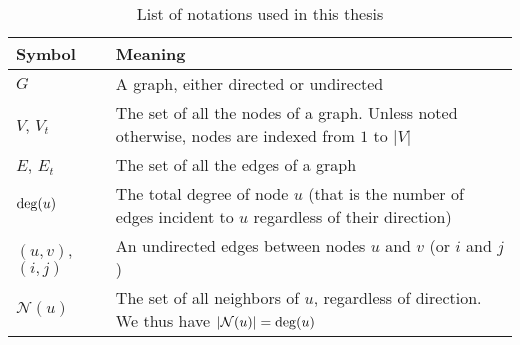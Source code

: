 \begin{table*}[htpb]
  \centering
  \caption{List of notations used in this thesis}\label{tab:notations}%
  \begin{tabulary}{187mm}{LL}
    \toprule
    Symbol & Meaning \\
    \midrule
    $G$ & A graph, either directed or undirected \\
    $V$, $V_t$ & The set of all the nodes of a graph. Unless noted otherwise, nodes are indexed from $1$ to $|V|$ \\
    $E$, $E_t$ & The set of all the edges of a graph \\
    $\operatorname{deg}(u)$ & The total degree of node $u$ (that is the number of edges incident to $u$
    regardless of their direction) \\
    $(u,v)$, $(i,j)$ & An undirected edges between nodes $u$ and $v$ (or $i$ and $j$) \\
    $\mathcal{N}(u)$ & The set of all neighbors of $u$, regardless of direction. We thus have
    $|\mathcal{N}(u)| = \operatorname{deg}(u)$ \\
    \bottomrule
  \end{tabulary}
\end{table*}
